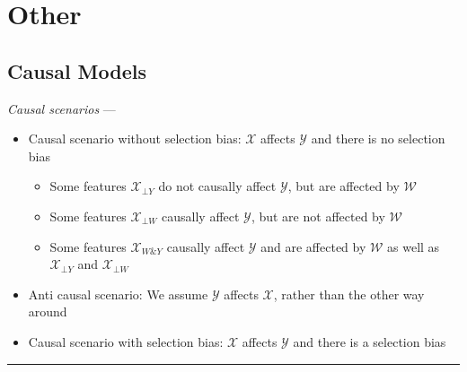 \section{Other}
\subsection*{Causal Models}
\emph{Causal scenarios} --- 
\begin{itemize}
    \item Causal scenario without selection bias: $\mathcal{X}$ affects $\mathcal{Y}$ and there is no selection bias 
    \begin{itemize}
        \item Some features $\mathcal{X}_{\bot Y}$ do not causally affect $\mathcal{Y}$, but are affected by $\mathcal{W}$
        \item Some features $\mathcal{X}_{\bot W}$ causally affect $\mathcal{Y}$, but are not affected by $\mathcal{W}$
        \item Some features $\mathcal{X}_{W \& Y}$ causally affect $\mathcal{Y}$ and are affected by $\mathcal{W}$ as well as $\mathcal{X}_{\bot Y}$ and $\mathcal{X}_{\bot W}$
    \end{itemize}
    \item Anti causal scenario: We assume $\mathcal{Y}$ affects $\mathcal{X}$, rather than the other way around
    \item Causal scenario with selection bias: $\mathcal{X}$ affects $\mathcal{Y}$ and there is a selection bias 
\end{itemize}

{\color{lightgray}\hrule height 0.001mm}

